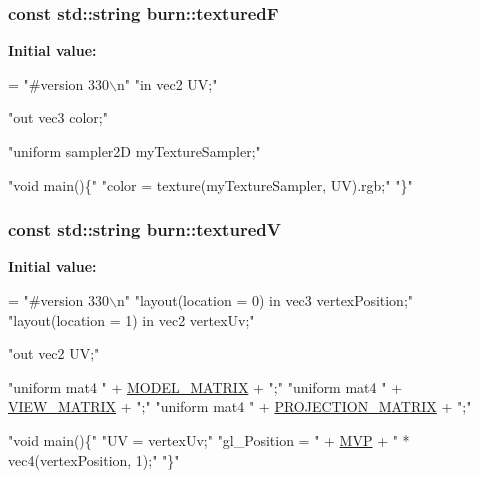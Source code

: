 \hypertarget{namespaceburn_aa50f80a84ae71807267b64cdb3b06b3e}{
\subsubsection[{textured\-F}]{\setlength{\rightskip}{0pt plus 5cm}const std\-::string burn\-::textured\-F}}\label{namespaceburn_aa50f80a84ae71807267b64cdb3b06b3e}
{\bfseries Initial value\-:}
\begin{DoxyCode}
= \textcolor{stringliteral}{"#version 330\(\backslash\)n"}
        \textcolor{stringliteral}{"in vec2 UV;"}

        \textcolor{stringliteral}{"out vec3 color;"}

        \textcolor{stringliteral}{"uniform sampler2D myTextureSampler;"}

        \textcolor{stringliteral}{"void main()\{"}
            \textcolor{stringliteral}{"color = texture(myTextureSampler, UV).rgb;"}
        \textcolor{stringliteral}{"\}"}
\end{DoxyCode}
\hypertarget{namespaceburn_a3d60f931a7ad5b52bf67858342c6621a}{
\subsubsection[{textured\-V}]{\setlength{\rightskip}{0pt plus 5cm}const std\-::string burn\-::textured\-V}}\label{namespaceburn_a3d60f931a7ad5b52bf67858342c6621a}
{\bfseries Initial value\-:}
\begin{DoxyCode}
= \textcolor{stringliteral}{"#version 330\(\backslash\)n"}
        \textcolor{stringliteral}{"layout(location = 0) in vec3 vertexPosition;"}
        \textcolor{stringliteral}{"layout(location = 1) in vec2 vertexUv;"}

        \textcolor{stringliteral}{"out vec2 UV;"}

        \textcolor{stringliteral}{"uniform mat4 "} + \hyperlink{namespaceburn_aef2bc91c4c84fa143da611ee2f284c8b}{MODEL\_MATRIX} + \textcolor{stringliteral}{";"}
        \textcolor{stringliteral}{"uniform mat4 "} + \hyperlink{namespaceburn_a7cb7c6572d4f7796ea3e5edae85e51f1}{VIEW\_MATRIX} + \textcolor{stringliteral}{";"}
        \textcolor{stringliteral}{"uniform mat4 "} + \hyperlink{namespaceburn_ae5e90743826abef0fbc9d54704ae2a6f}{PROJECTION\_MATRIX} + \textcolor{stringliteral}{";"}

        \textcolor{stringliteral}{"void main()\{"}
            \textcolor{stringliteral}{"UV = vertexUv;"}
            \textcolor{stringliteral}{"gl\_Position = "} + \hyperlink{namespaceburn_a7c71b053f299e14c880f0f11ba916a44}{MVP} + \textcolor{stringliteral}{" * vec4(vertexPosition, 1);"}
        \textcolor{stringliteral}{"\}"}
\end{DoxyCode}
